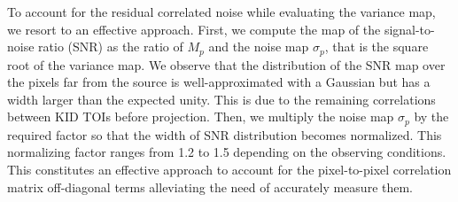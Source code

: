 
{\lp To account for the residual
correlated noise while evaluating the variance map, we resort to an
effective approach.
First, we compute the map of the signal-to-noise ratio (SNR) as the ratio of
$M_p$ and the noise map $\sigma_p$, that is the square root of the
variance map. We observe that the distribution of the SNR map over the pixels far from the source is
well-approximated with a Gaussian but has a width larger than the
expected unity. This is due to the remaining correlations between KID TOIs
before projection. Then, we multiply the noise map 
$\sigma_p$ by the required factor so
that the width of SNR distribution becomes normalized.
This normalizing factor ranges from 1.2 to 1.5 depending on the observing conditions. This
constitutes an effective approach to account for the pixel-to-pixel
correlation matrix off-diagonal terms alleviating the need of
accurately measure them.}

%
%

